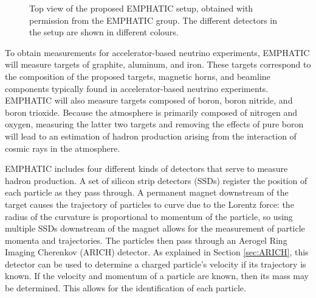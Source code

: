 \begin{figure}[] 
\centering
{}
\caption{Top view of the proposed EMPHATIC setup, obtained with permission from the EMPHATIC group. The different detectors in the setup are shown in different colours.}
\label{fig:EMPHATIC} 
\end{figure}

To obtain measurements for accelerator-based neutrino experiments, \ac{EMPHATIC} will measure targets of graphite, aluminum, and iron.
These targets correspond to the composition of the proposed targets, magnetic horns, and beamline components typically found in accelerator-based neutrino experiments.
\ac{EMPHATIC} will also measure targets composed of boron, boron nitride, and boron trioxide.
Because the atmosphere is primarily composed of nitrogen and oxygen, measuring the latter two targets and removing the effects of pure boron will lead to an estimation of hadron production arising from the interaction of cosmic rays in the atmosphere. 

\ac{EMPHATIC} includes four different kinds of detectors that serve to measure hadron production.
A set of silicon strip detectors (SSDs) register the position of each particle as they pass through.
A permanent magnet downstream of the target causes the trajectory of particles to curve due to the Lorentz force: the radius of the curvature is proportional to momentum of the particle, so using multiple SSDs downstream of the magnet allows for the measurement of particle momenta and trajectories.
The particles then pass through an Aerogel Ring Imaging Cherenkov (ARICH) detector.
As explained in Section \ref{sec:ARICH}, this detector can be used to determine a charged particle's velocity if its trajectory is known. 
If the velocity and momentum of a particle are known, then its mass may be determined.
This allows for the identification of each particle. 

